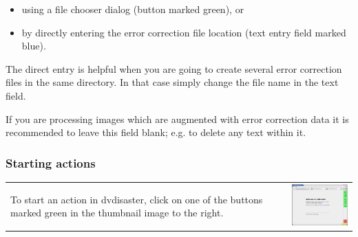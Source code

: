 \begin{itemize}
\item using a file chooser dialog (button marked green), or
\item by directly entering the error correction file location (text entry field marked blue).
\end{itemize}

The direct entry is helpful when you are going to create several 
error correction files in the same directory. In that case simply change the 
file name in the text field. 

\medskip

If you are processing images which are augmented with error correction data
it is recommended to leave this field blank; e.g. to delete any text within it.

\newpage

\subsubsection{Starting actions}
\label{howto-dialogs-buttons}

\begin{tabular}{ll}
\begin{minipage}{108mm}
To start an action in dvdisaster, click on one of the buttons marked green in the thumbnail
image to the right.
\end{minipage}
&
\begin{minipage}{50mm}
    \centerline{\includegraphics[width=40mm]{screenshots/action-buttons.png}}
\end{minipage}
\end{tabular}

\bigskip

